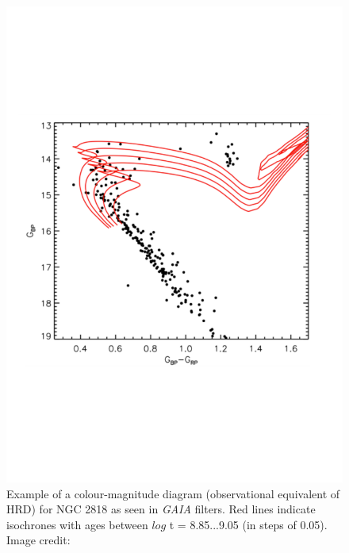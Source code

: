 \begin{figure}
    \centering
    \includegraphics[scale=0.45]{Figures/1-Introduction/gaia_OC_example.pdf}
    \caption[Example of model isochrones for a cluster]{Example of a colour-magnitude diagram (observational equivalent of HRD) for NGC 2818 as seen in \textit{GAIA} filters. Red lines indicate isochrones with ages between $log$ t = 8.85...9.05 (in steps of 0.05). Image credit: \citet{Bastian_etal_2018}}
    \label{fig:OC_isochrone_example}
\end{figure}

